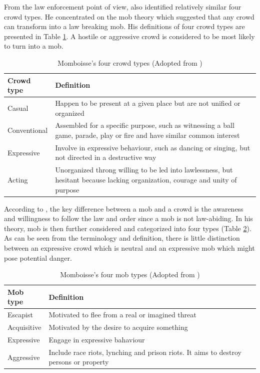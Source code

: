 From the law enforcement point of view, \citet{Momboisse1967} also identified relatively similar four crowd types. He concentrated on the mob theory which suggested that any crowd can transform into a law breaking mob. His definitions of four crowd types are presented in Table \ref{table:momboisseCrowdType}. A hostile or aggressive crowd is considered to be most likely to turn into a mob.

\begin{table}[!htbp]
	\caption{Momboisse's four crowd types (Adopted from \citet{Schweingruber2000})}
	\label{table:momboisseCrowdType}
	\centering
	\begin{tabular}{|l|p{10cm}|}
		\hline
		\textbf{Crowd type} & \textbf{Definition} \\ \hline \hline
		Casual & Happen to be present at a given place but are not unified or organized \\ \hline
		Conventional & Assembled for a specific purpose, such as witnessing a ball game, parade, play or fire 
		and have similar common interest \\ \hline
		Expressive & Involve in expressive behaviour, such as dancing or singing, but not directed in a destructive way \\ \hline
		Acting & Unorganized throng willing to be led into lawlessness, but hesitant because lacking organization, courage and unity of purpose \\ \hline
	\end{tabular}
\end{table}


According to \citet{Momboisse1967}, the key difference between a mob and a crowd is the awareness and willingness to follow the law and order since a mob is not law-abiding. In his theory, mob is then further considered and categorized into four types (Table \ref{table:momboisseMobType}). As can be seen from the terminology and definition, there is little distinction between an expressive crowd which is neutral and an expressive mob which might pose potential danger.

\begin{table}
	\caption{Momboisse's four mob types (Adopted from \citet{Schweingruber2000})}
	\label{table:momboisseMobType}
	\centering
	\begin{tabular}{|l|p{10cm}|}
		\hline
		\textbf{Mob type} & \textbf{Definition} \\ \hline \hline
		Escapist & Motivated to flee from a real or imagined threat \\ \hline
		Acquisitive &  Motivated by the desire to acquire something \\ \hline
		Expressive & Engage in expressive bahaviour \\ \hline
		Aggressive & Include race riots, lynching and prison riots. It aims to destroy persons or property \\ \hline
	\end{tabular}
\end{table}


